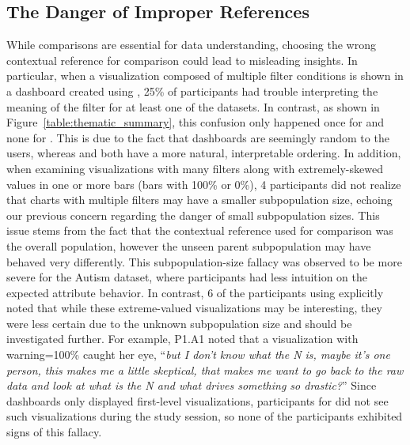 \subsection{The Danger of Improper References}
\par While comparisons are essential for data understanding, choosing the wrong contextual reference for comparison could lead to misleading insights. In particular, when a visualization composed of multiple filter conditions is shown in a dashboard created using \cluster, 25\% of participants had trouble interpreting the meaning of the filter for at least one of the datasets. In contrast, as shown in Figure~\ref{table:thematic_summary}, this confusion only happened once for \BFS and none for \system. This is due to the fact that \cluster dashboards are seemingly random to the users, whereas \BFS and \system both have a more natural, interpretable ordering. In addition, when examining visualizations with many filters along with extremely-skewed values in one or more bars (bars with 100\% or 0\%), 4 \cluster participants did not realize that charts with multiple filters may have a smaller subpopulation size, echoing our previous concern regarding the danger of small subpopulation sizes. This issue stems from the fact that the contextual reference used for comparison was the overall population, however the unseen parent subpopulation may have behaved very differently. This subpopulation-size fallacy was observed to be more severe for the Autism dataset, where participants had less intuition on the expected attribute behavior. In contrast, 6 of the participants using \system explicitly noted that while these extreme-valued visualizations may be interesting, they were less certain due to the unknown subpopulation size and should be investigated further. For example, P1.A1 noted that a visualization with warning=100\% caught her eye, ``\textit{but I don't know what the N is, maybe it's one person, this makes me a little skeptical, that makes me want to go back to the raw data and look at what is the N and what drives something so drastic?}'' Since \BFS dashboards only displayed first-level visualizations, participants for \BFS did not see such visualizations during the study session, so none of the \BFS participants exhibited signs of this fallacy.

